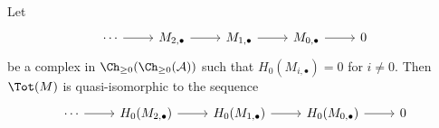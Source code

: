 \documentclass[main.tex]{subfiles}
\begin{document}
\begin{corollary}
  Let
  \begin{equation*}
    \begin{tikzcd}
      \cdots
      \arrow[r]
      & M_{2,\bullet}
      \arrow[r]
      & M_{1,\bullet}
      \arrow[r]
      & M_{0,\bullet}
      \arrow[r]
      & 0
    \end{tikzcd}
  \end{equation*}
  be a complex in $\Ch_{\geq 0}(\Ch_{\geq 0}(\mathcal{A}))$ such that $H_{0}(M_{i, \bullet}) = 0$ for $i \neq 0$. Then $\Tot(M)$ is quasi-isomorphic to the sequence
  \begin{equation*}
    \begin{tikzcd}
      \cdots
      \arrow[r]
      & H_{0}(M_{2,\bullet})
      \arrow[r]
      & H_{0}(M_{1,\bullet})
      \arrow[r]
      & H_{0}(M_{0,\bullet})
      \arrow[r]
      & 0
    \end{tikzcd}
  \end{equation*}
\end{corollary}
\end{document}
